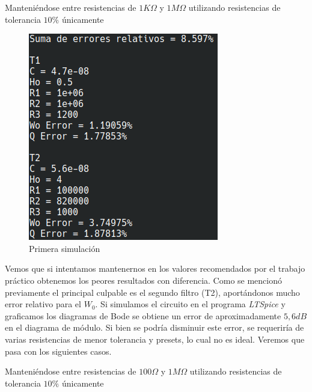 \documentclass[11pt,a4paper]{report}
\begin{document}
\clearpage
\begin{list}{•}
\item Manteniéndose entre resistencias de $1K\Omega$ y $1M\Omega$ utilizando resistencias de tolerancia $10\%$ únicamente

\vspace{10 mm}

\begin{figure}[h!]
\centering
\includegraphics[scale=1]{ResultadosPrimerCaso.png}
\caption{Primera simulación}
\end{figure}

Vemos que si intentamos mantenernos en los valores recomendados por el trabajo práctico obtenemos los peores resultados con diferencia. Como se mencionó previamente
el principal culpable es el segundo filtro (T2), aportándonos mucho error relativo
para el $W_{0}$. Si simulamos el circuito en el programa \textit{LTSpice} y graficamos los diagramas de Bode se obtiene un error de aproximadamente $5,6dB$ en el diagrama de módulo. Si bien se podría disminuir este error, se requeriría de varias resistencias de menor tolerancia y presets, lo cual no es ideal. Veremos que pasa con los siguientes casos.

\newpage

\item
\item Manteniéndose entre resistencias de $100\Omega$ y $1M\Omega$ utilizando resistencias de tolerancia $10\%$ únicamente

\vspace{10 mm}


\end{list}
\end{document}
